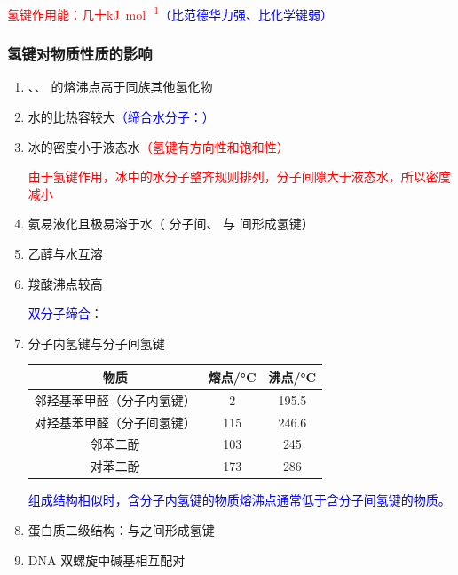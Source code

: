 		\textcolor{red}{氢键作用能：几十\si{\kilo\joule\per\mole}}\textcolor{blue}{（比范德华力强、比化学键弱）}

		\subsubsection{氢键对物质性质的影响}\label{subsubsec:氢键对物质性质的影响}

			\begin{enumerate}
				\item {}、、 的熔沸点高于同族其他氢化物
				\item 水的比热容较大\textcolor{blue}{（缔合水分子：）}
				\item 冰的密度小于液态水\textcolor{red}{（氢键有方向性和饱和性）}
				
				\textcolor{red}{由于氢键作用，冰中的水分子整齐规则排列，分子间隙大于液态水，所以密度减小}

				\item 氨易液化且极易溶于水（\cemh{NH3} 分子间、 与  间形成氢键）
				\item 乙醇与水互溶
				

				\item 羧酸沸点较高
				
				\textcolor{blue}{双分子缔合}：
				
				\item 分子内氢键与分子间氢键	
					\begin{center}
					\small
					\begin{tabular}{|c|c|c|}
						\hline
						\noindent\textbf{物质} & \textbf{熔点/\si{\celsius}} & \textbf{沸点/\si{\celsius}} \\
						\hline
						邻羟基苯甲醛（分子内氢键） & 2 & 195.5 \\
						\hline
						对羟基苯甲醛（分子间氢键） & 115 & 246.6 \\
						\hline
						邻苯二酚 & 103 & 245 \\
						\hline
						对苯二酚 & 173 & 286 \\
						\hline
					\end{tabular}
					\end{center}

					\textcolor{blue}{组成结构相似时，含分子内氢键的物质熔沸点通常低于含分子间氢键的物质。}
				\item 蛋白质二级结构：与之间形成氢键
				\item DNA 双螺旋中碱基相互配对
			\end{enumerate}
